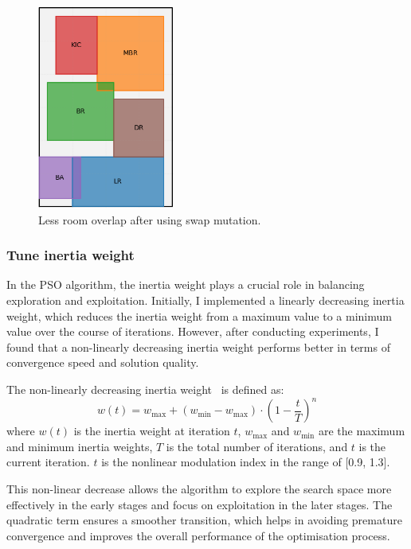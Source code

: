 \documentclass[]{article}
\begin{document}
\begin{figure}[h]
    \centering
    \includegraphics[width=0.4\textwidth]{images/swap-rooms.png}
    \caption{Less room overlap after using swap mutation.}
    \label{fig:swap-rooms}
\end{figure}

\subsubsection{Tune inertia weight}
In the PSO algorithm, the inertia weight plays a crucial role in balancing exploration and exploitation. Initially, I implemented a linearly decreasing inertia weight, which reduces the inertia weight from a maximum value to a minimum value over the course of iterations. However, after conducting experiments, I found that a non-linearly decreasing inertia weight performs better in terms of convergence speed and solution quality.

The non-linearly decreasing inertia weight~\cite{HousseinEssamH.2021MAiP} is defined as:
\begin{equation*}
    w(t) = w_{\text{max}} + (w_{\text{min}} - w_{\text{max}}) \cdot \left(1 - \frac{t}{T}\right)^n
\end{equation*}
where $w(t)$ is the inertia weight at iteration $t$, $w_{\text{max}}$ and $w_{\text{min}}$ are the maximum and minimum inertia weights, $T$ is the total number of iterations, and $t$ is the current iteration. $t$ is the nonlinear modulation index in the range of [0.9, 1.3].

This non-linear decrease allows the algorithm to explore the search space more effectively in the early stages and focus on exploitation in the later stages. The quadratic term ensures a smoother transition, which helps in avoiding premature convergence and improves the overall performance of the optimisation process.
\end{document}
